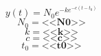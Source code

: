 \documentclass[border=0pt,varwidth,fleqn]{standalone}
\begin{document}
 
\huge
\[
    y(t) = N_0 e^{-k e^{-c (t - t_0)}}
\]
\large
\[
    N_0 = \textbf{<<N0>>}
\]
\[
    k = \textbf{<<k>>}
\]
\[
    c = \textbf{<<c>>}
\]
\[
    t_0 = \textbf{<<t0>>}
\]
\end{document}
